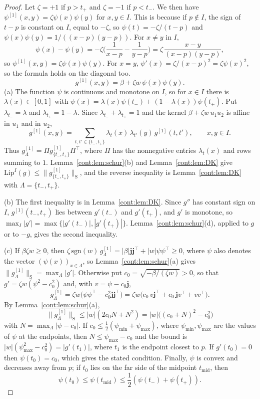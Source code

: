 \begin{proof}
Let $\zeta=+1$ if $p>t_+$ and $\zeta=-1$ if $p<t_-$. We then have $\psi^{[1]}(x,y)=\zeta\psi(x)\psi(y)$ for $x,y\in I$. This is because if $p\notin I$, the sign of $t-p$ is constant on $I$, equal to $-\zeta$, so $\psi(t)=-\zeta/(t-p)$ and $\psi(x)\psi(y)=1/((x-p)(y-p))$. For $x\neq y$ in $I$,
\[
  \psi(x)-\psi(y)=-\zeta\Big(\frac1{x-p}-\frac1{y-p}\Big)=\zeta\,\frac{x-y}{(x-p)(y-p)},
\]
so $\psi^{[1]}(x,y)=\zeta\psi(x)\psi(y)$. For $x=y$, $\psi'(x)=\zeta/(x-p)^2=\zeta\psi(x)^2$, so the formula holds on the diagonal too.
\[
g^{[1]}(x,y)=\beta+\zeta w\,\psi(x)\psi(y).
\]
(a) The function $\psi$ is continuous and monotone on $I$, so for $x\in I$ there is $\lambda(x)\in[0,1]$ with $\psi(x)=\lambda(x)\psi(t_-)+(1-\lambda(x))\psi(t_+)$. Put $\lambda_{t_-}=\lambda$ and $\lambda_{t_+}=1-\lambda$. Since $\lambda_{t_-}+\lambda_{t_+}=1$ and the kernel $\beta+\zeta w\,u_1u_2$ is affine in $u_1$ and in $u_2$,
\[
g^{[1]}(x,y)=\sum_{t,t'\in\{t_-,t_+\}}\lambda_t(x)\,\lambda_{t'}(y)\,g^{[1]}(t,t'),\qquad x,y\in I.
\]
Thus $g^{[1]}_\Lambda=\Pi g^{[1]}_{\{t_-,t_+\}}\Pi^\top$, where $\Pi$ has the nonnegative entries $\lambda_t(x)$ and rows summing to $1$. Lemma~\ref{cont:lem:schur}(b) and Lemma~\ref{cont:lem:DK} give $\mathrm{Lip}^I(g)\leq\|g^{[1]}_{\{t_-,t_+\}}\|_{\mathrm S}$, and the reverse inequality is Lemma~\ref{cont:lem:DK} with $\Lambda=\{t_-,t_+\}$.
 
(b) The first inequality is in Lemma~\ref{cont:lem:DK}. Since $g''$ has constant sign on $I$, $g^{[1]}(t_-,t_+)$ lies between $g'(t_-)$ and $g'(t_+)$, and $g'$ is monotone, so $\max_I|g'|=\max\{|g'(t_-)|,|g'(t_+)|\}$. Lemma~\ref{cont:lem:schur}(d), applied to $g$ or to $-g$, gives the second inequality.
 
(c) If $\beta\zeta w\geq0$, then $\zeta\,\mathrm{sgn}(w)\,g^{[1]}_\Lambda=|\beta|\mathbf{j}\mathbf{j}^\top+|w|\psi\psi^\top\geq0$, where $\psi$ also denotes the vector $(\psi(x))_{x\in\Lambda}$, so Lemma~\ref{cont:lem:schur}(a) gives $\|g^{[1]}_\Lambda\|_{\mathrm S}=\max_\Lambda|g'|$. Otherwise put $c_0=\sqrt{-\beta/(\zeta w)}>0$, so that $g'=\zeta w(\psi^2-c_0^2)$ and, with $v=\psi-c_0\mathbf{j}$,
\[
g^{[1]}_\Lambda=\zeta w\big(\psi\psi^\top-c_0^2\mathbf{j}\mathbf{j}^\top\big)=\zeta w\big(c_0\,v\mathbf{j}^\top+c_0\,\mathbf{j}v^\top+vv^\top\big).
\]
By Lemma~\ref{cont:lem:schur}(a),
\[
\|g^{[1]}_\Lambda\|_{\mathrm S}\leq|w|(2c_0N+N^2)=|w|\big((c_0+N)^2-c_0^2\big)
\]
with $N=\max_\Lambda|\psi-c_0|$. If $c_0\leq\frac12(\psi_{\min}+\psi_{\max})$, where $\psi_{\min},\psi_{\max}$ are the values of $\psi$ at the endpoints, then $N\leq\psi_{\max}-c_0$ and the bound is $|w|(\psi_{\max}^2-c_0^2)=|g'(t_1)|$, where $t_1$ is the endpoint closest to $p$. If $g'(t_0)=0$ then $\psi(t_0)=c_0$, which gives the stated condition. Finally, $\psi$ is convex and decreases away from $p$; if $t_0$ lies on the far side of the midpoint $t_{\mathrm{mid}}$, then
\[
\psi(t_0)\leq\psi(t_{\mathrm{mid}})\leq\frac12(\psi(t_-)+\psi(t_+)).
\]
 

\end{proof}
